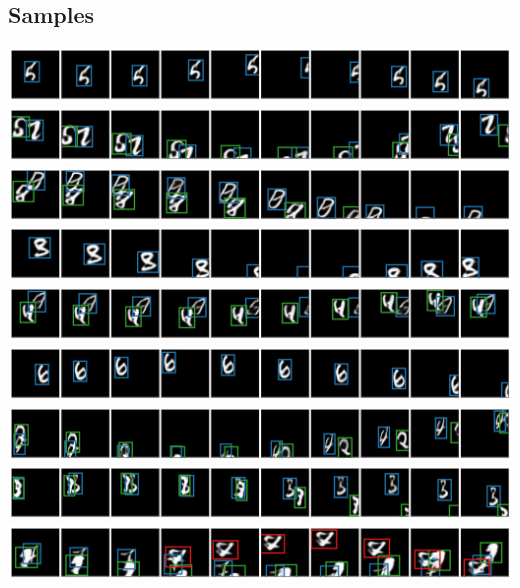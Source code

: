 \subsection{Samples}
\begin{center}
    \includegraphics[width=\linewidth]{figures/SQAIR/mnist_samples/000044.png}
    \includegraphics[width=\linewidth]{figures/SQAIR/mnist_samples/000059.png}
    \includegraphics[width=\linewidth]{figures/SQAIR/mnist_samples/000060.png}
    \includegraphics[width=\linewidth]{figures/SQAIR/mnist_samples/000062.png}
    \includegraphics[width=\linewidth]{figures/SQAIR/mnist_samples/000071.png}
    \includegraphics[width=\linewidth]{figures/SQAIR/mnist_samples/000073.png}
    \includegraphics[width=\linewidth]{figures/SQAIR/mnist_samples/000092.png}
    \includegraphics[width=\linewidth]{figures/SQAIR/mnist_samples/000157.png}
    \includegraphics[width=\linewidth]{figures/SQAIR/mnist_sample_curious/000089.png}
    \label{fig:mnist_samples_additional}
\end{center}

